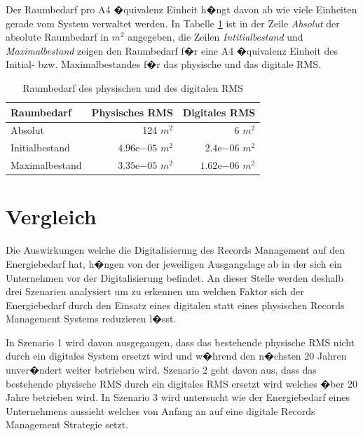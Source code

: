 \documentclass[a4paper,twoside,10pt]{report}
\begin{document}
Der Raumbedarf pro A4 �quivalenz Einheit h�ngt davon ab wie viele Einheiten gerade vom System verwaltet werden. In Tabelle \ref{tab:ges_raum_comp} ist in der Zeile \emph{Absolut} der absolute Raumbedarf in $m^2$ angegeben, die Zeilen \emph{Intitialbestand} und \emph{Maximalbestand} zeigen den Raumbedarf f�r eine A4 �quivalenz Einheit des Initial- bzw. Maximalbestandes f�r das physische und das digitale \ac{RMS}.

\begin{table} [h]
	\begin{tabular}{l|r|r}
	\hline
	\textbf{Raumbedarf} & \textbf{Physisches RMS} & \textbf{Digitales RMS}\\
	\hline
	Absolut  				& 124 $m^2$											& 6 $m^2$ \\
	Initialbestand  & $4.96\mathrm{e}{-05}$ $ m^2$	& $2.4\mathrm{e}{-06}$ $ m^2$ \\
	Maximalbestand 	& $3.35\mathrm{e}{-05}$ $ m^2$ 	& $1.62\mathrm{e}{-06}$ $m^2$\\
	\hline
	\end{tabular}
\caption{Raumbedarf des physischen und des digitalen \ac{RMS}} 
\label{tab:ges_raum_comp}
\end{table}

\section{Vergleich}\label{sec:vergleichenergie}
Die Auswirkungen welche die Digitalisierung des Records Management auf den Energiebedarf hat, h�ngen von der jeweiligen Ausgangslage ab in der sich ein Unternehmen vor der Digitalisierung befindet. An dieser Stelle werden deshalb drei Szenarien analysiert um zu erkennen um welchen Faktor sich der Energiebedarf durch den Einsatz eines digitalen statt eines physischen Records Management Systems reduzieren l�sst. 

In Szenario 1 wird davon ausgegangen, dass das bestehende physische \ac{RMS} nicht durch ein digitales System ersetzt wird und w�hrend den n�chsten 20 Jahren unver�ndert weiter betrieben wird. Szenario 2 geht davon aus, dass das bestehende physische \ac{RMS} durch ein digitales \ac{RMS} ersetzt wird welches �ber 20 Jahre betrieben wird. In Szenario 3 wird untersucht wie der Energiebedarf eines Unternehmens aussieht welches von Anfang an auf eine digitale Records Management Strategie setzt. 
\end{document}
